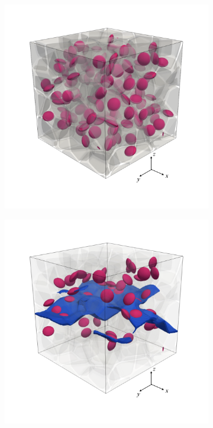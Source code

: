 \begin{figure}[!htb]
\begin{subfigure}{0.32\textwidth}
    \caption{}
    \label{b100_ini}
  \end{subfigure}
  \begin{subfigure}{0.32\textwidth}
    \centering
    \includegraphics[width=\textwidth]{Chapter3/figures/b150_ini_new}
    \caption{}
    \label{b150_ini}
  \end{subfigure}
  \begin{subfigure}{0.32\textwidth}
    \centering
    \includegraphics[width=\textwidth]{Chapter3/figures/b50_end}

\end{subfigure}
\end{figure}
